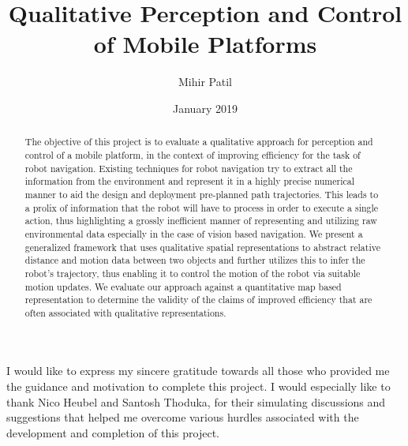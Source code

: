 \documentclass[rnd]{mas_report}
\author{Mihir Patil}
\title{Qualitative Perception and Control of Mobile Platforms}
\date{January  2019}
\begin{document}
\begin{titlepage}
    \maketitle
\end{titlepage}


\pagestyle{plain}


\cleardoublepage
\statementpage

\begin{abstract}
\paragraph{}The objective of this project is to evaluate a qualitative approach for perception and control of a mobile platform, in the context of improving efficiency for the task of robot navigation. Existing techniques for robot navigation try to extract all the information from the environment and represent it in a highly precise numerical manner to aid the design and deployment pre-planned path trajectories. This leads to a prolix of information that the robot will have to process in order to execute a single action, thus highlighting a grossly inefficient manner of representing and utilizing raw environmental data especially in the case of vision based navigation. We present a generalized framework that uses qualitative spatial representations to abstract relative distance and motion data between two objects and further utilizes this to infer the robot's trajectory, thus enabling it to control the motion of the robot via suitable motion updates. We evaluate our approach against a quantitative map based representation to determine the validity of the claims of improved efficiency that are often associated with qualitative representations.
\end{abstract}

\begin{acknowledgements}
\paragraph{}I would like to express my sincere gratitude towards  all those who provided me the guidance and motivation to complete this project.  I would especially like to thank Nico Heubel and Santosh Thoduka, for their simulating discussions and suggestions
that helped me overcome various hurdles associated with the development and completion of this project.
\end{acknowledgements}
\end{document}
